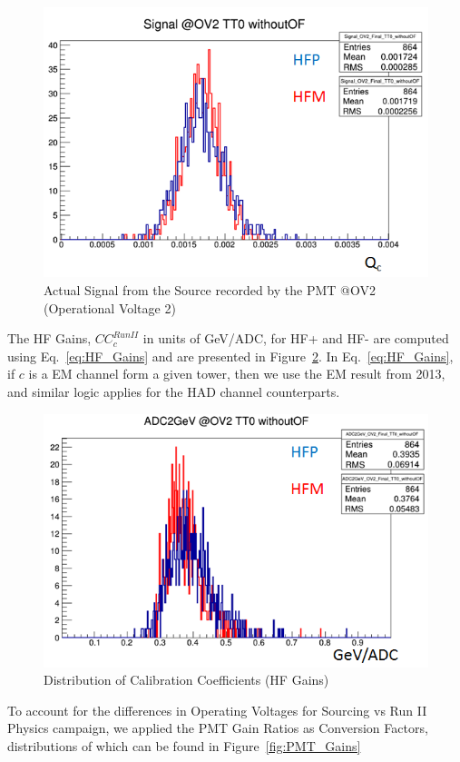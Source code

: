 \begin{figure}[htb]
	\begin{center}
		\includegraphics[width=.5\textwidth]{figures/ch_hfcalibration/Signal_@OV2_TT0_withoutOF_FORDN.png}
		\caption{Actual Signal from the Source recorded by the PMT @OV2 (Operational Voltage 2)}
		\label{fig:Signal_@OV2_TT0_withoutOF_FORDN}
	\end{center}
\end{figure}

The HF Gains, ${CC}^{Run II}_{c}$ in units of GeV/ADC, for HF+ and HF- are
computed using Eq.~\ref{eq:HF_Gains} and are presented in Figure~\ref{fig:ADC2GeV_OV2_TT0_withoutOF_FORDN}.
In Eq.~\ref{eq:HF_Gains}, if $c$ is a EM channel form a given tower, then we use
the EM result from 2013, and similar logic applies for the HAD channel
counterparts.

\begin{figure}[htb]
	\begin{center}
		\includegraphics[width=.5\textwidth]{figures/ch_hfcalibration/ADC2GeV_OV2_TT0_withoutOF_FORDN.png}
		\caption{Distribution of Calibration Coefficients (HF Gains)}
		\label{fig:ADC2GeV_OV2_TT0_withoutOF_FORDN}
	\end{center}
\end{figure}

To account for the differences in Operating Voltages for Sourcing vs Run II Physics campaign, we applied the PMT Gain Ratios as Conversion Factors, distributions of which can be found in Figure~\ref{fig:PMT_Gains}

